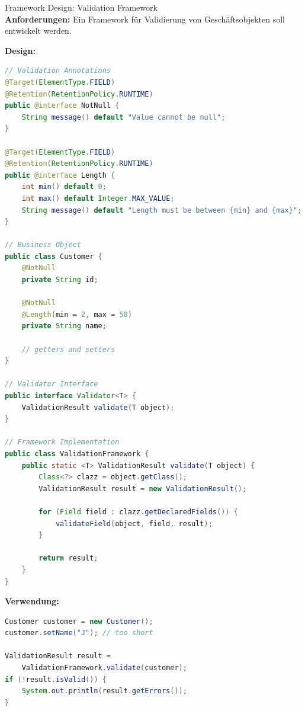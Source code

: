\begin{example2}{Framework Design: Validation Framework}\\
\textbf{Anforderungen:}
Ein Framework für Validierung von Geschäftsobjekten soll entwickelt werden.

\textbf{Design:}
\begin{lstlisting}[language=Java, style=basesmol]
// Validation Annotations
@Target(ElementType.FIELD)
@Retention(RetentionPolicy.RUNTIME)
public @interface NotNull {
    String message() default "Value cannot be null";
}

@Target(ElementType.FIELD)
@Retention(RetentionPolicy.RUNTIME)
public @interface Length {
    int min() default 0;
    int max() default Integer.MAX_VALUE;
    String message() default "Length must be between {min} and {max}";
}

// Business Object
public class Customer {
    @NotNull
    private String id;
    
    @NotNull
    @Length(min = 2, max = 50)
    private String name;
    
    // getters and setters
}

// Validator Interface
public interface Validator<T> {
    ValidationResult validate(T object);
}

// Framework Implementation
public class ValidationFramework {
    public static <T> ValidationResult validate(T object) {
        Class<?> clazz = object.getClass();
        ValidationResult result = new ValidationResult();
        
        for (Field field : clazz.getDeclaredFields()) {
            validateField(object, field, result);
        }
        
        return result;
    }
}
\end{lstlisting}

\textbf{Verwendung:}
\begin{lstlisting}[language=Java, style=basesmol]
Customer customer = new Customer();
customer.setName("J"); // too short

ValidationResult result = 
    ValidationFramework.validate(customer);
if (!result.isValid()) {
    System.out.println(result.getErrors());
}
\end{lstlisting}
\end{example2}

